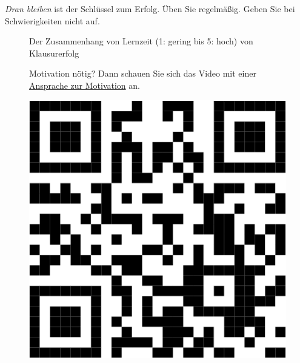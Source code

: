\documentclass[
  letterpaper,
  twoside,
  open=any]{scrbook}
\theoremstyle{definition}
\theoremstyle{definition}
\theoremstyle{definition}
\theoremstyle{remark}
\begin{document}
\emph{Dran bleiben} ist der Schlüssel zum Erfolg. Üben Sie regelmäßig.
Geben Sie bei Schwierigkeiten nicht auf. 
  

\begin{figure}


\caption{\label{fig-lernen}Der Zusammenhang von Lernzeit (1: gering bis
5: hoch) von Klausurerfolg}

\end{figure}%

\begin{figure}

\begin{minipage}{0.80\linewidth}
Motivation nötig? Dann schauen Sie sich das Video mit einer
\href{https://youtu.be/jtNlzpcPr5Y}{Ansprache zur Motivation}
an.\end{minipage}%
%
\begin{minipage}{0.20\linewidth}

\begin{center}
\includegraphics[width=0.75\linewidth,height=\textheight,keepaspectratio]{005-orga_files/figure-pdf/unnamed-chunk-2-1.pdf}
\end{center}

\end{minipage}%

\end{figure}%
\end{document}
